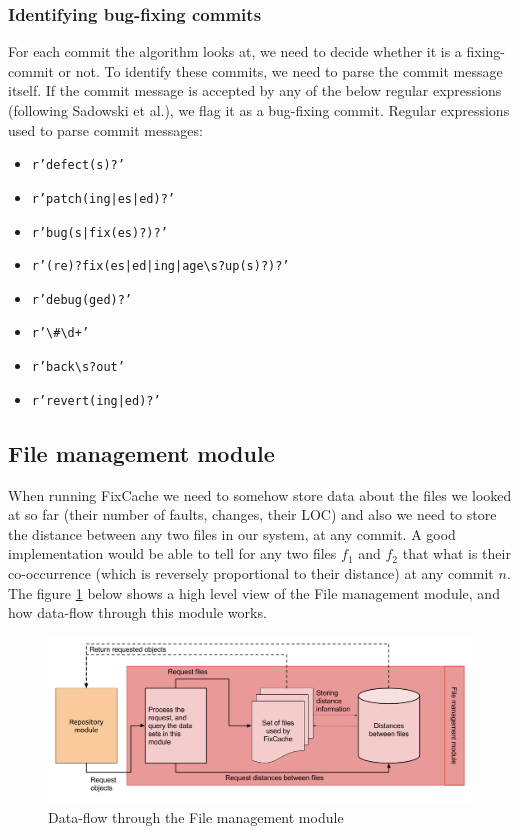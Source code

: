\documentclass[12pt,twoside,notitlepage]{report}
\newcommand{\fxch}{FixCache}
\begin{document}
\subsubsection*{Identifying bug-fixing commits}
For each commit the algorithm looks at, we need to decide whether it is a fixing-commit or not. To identify these commits, we need to parse the commit message itself. If the commit message is accepted by any of the below regular expressions (following Sadowski et al.\cite{Sadowski}), we flag it as a bug-fixing commit. 
\clearpage
Regular expressions used to parse commit messages:
\begin{itemize}
\item \texttt{r'defect(s)?'}
\item \texttt{r'patch(ing|es|ed)?'}
\item \texttt{r'bug(s|fix(es)?)?'}
\item \texttt{r'(re)?fix(es|ed|ing|age\textbackslash s?up(s)?)?'}
\item \texttt{r'debug(ged)?'}
\item \texttt{r'\textbackslash\#\textbackslash d+'}
\item \texttt{r'back\textbackslash s?out'}
\item \texttt{r'revert(ing|ed)?'}
\end{itemize}
\subsection{File management module}
When running \fxch{}{} we need to somehow store data about the files we looked at so far (their number of faults, changes, their LOC) and also we need to store the distance between any two files in our system, at any commit. A  good implementation would be able to tell for any two files $f_1$ and $f_2$ that what is their co-occurrence (which is reversely proportional to their distance) at any commit $n$. The figure \ref{filemanagement_module} below shows a high level view of the File management module, and how data-flow through this module works.
\begin{figure}[h]
\includegraphics[width=1.0\textwidth]{filemanagement_module.png}
\caption{Data-flow through the File management module}
\label{filemanagement_module}
\end{figure}
\end{document}
